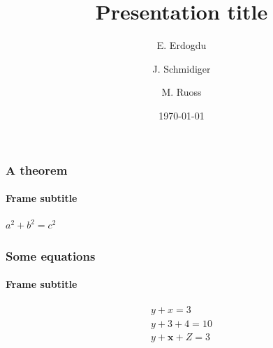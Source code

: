 \documentclass{beamer}
\title{Presentation title}
\author[E. Erdogdu, J. Schmidiger, M. Ruoss] %
{E. Erdogdu\inst{1} \and J. Schmidiger\inst{2} \and M. Ruoss\inst{3}}
\institute[UZH] %
{
  \inst{1}%
  Faculty of Banking and Finance\\
  Very Famous University
  \and
  \inst{2}%
  Faculty of Banking and Finance\\
  Very Famous University
  \and
  \inst{3}%
  Faculty of Banking and Finance\\
  Very Famous University
}
\date{\today}
\begin{document}
\frame{\titlepage}


\begin{frame}
    \frametitle{A theorem}
    \framesubtitle{Frame subtitle}
    \begin{theorem}
        $a^2 + b^2 = c^2$
    \end{theorem}
\end{frame}

\begin{frame}
    \frametitle{Some equations}
    \framesubtitle{Frame subtitle}
        \begin{align}
            y + x = 3\\
            y + 3 + 4 = 10\\
            y + \mathbf{x} + Z = 3
        \end{align}
\end{frame}
\end{document}
